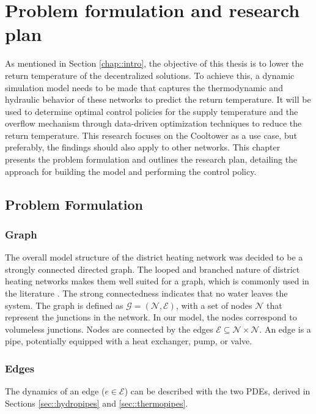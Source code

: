 \chapter{Problem formulation and research plan}\label{chap::PoA}
As mentioned in Section \ref{chap::intro}, the objective of this thesis is to lower the return temperature of the decentralized solutions. To achieve this, a dynamic simulation model needs to be made that captures the thermodynamic and hydraulic behavior of these networks to predict the return temperature. It will be used to determine optimal control policies for the supply temperature and the overflow mechanism through data-driven optimization techniques to reduce the return temperature. This research focuses on the Cooltower as a use case, but preferably, the findings should also apply to other networks. This chapter presents the problem formulation and outlines the research plan, detailing the approach for building the model and performing the control policy. 

\section{Problem Formulation} 
\subsection{Graph}
The overall model structure of the district heating network was decided to be a strongly connected directed graph. The looped and branched nature of district heating networks makes them well suited for a graph, which is commonly used in the literature \cite{sibeijn2025economic, Krug2020,OPPELT2016336,Simonssongraph}. The strong connectedness indicates that no water leaves the system. The graph is defined as $\mathcal{G}=(\mathcal{N}, \mathcal{E})$, with a set of nodes $\mathcal{N}$ that represent the junctions in the network. In our model, the nodes correspond to volumeless junctions. Nodes are connected by the edges $\mathcal{E} \subseteq \mathcal{N} \times \mathcal{N}$. An edge is a pipe, potentially equipped with a heat exchanger, pump, or valve. 

\subsection{Edges}
The dynamics of an edge ($e \in \mathcal{E}$) can be described with the two PDEs, derived in Sections \ref{sec::hydropipes} and \ref{sec::thermopipes}.

